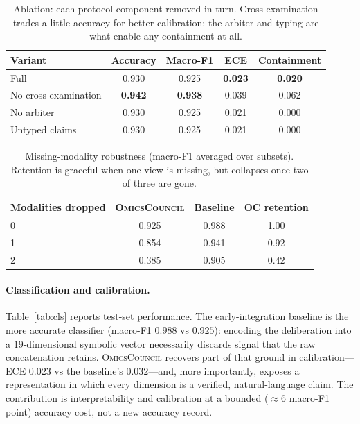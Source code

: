 \documentclass[runningheads]{llncs}
\begin{document}
\begin{table}[t]
\centering
\caption{Ablation: each protocol component removed in turn. Cross-examination trades a little accuracy for better calibration; the arbiter and typing are what enable any containment at all.}
\label{tab:abl}
\begin{tabular}{lcccc}
\toprule
Variant & Accuracy & Macro-F1 & ECE & Containment \\
\midrule
Full                  & 0.930 & 0.925 & \textbf{0.023} & \textbf{0.020} \\
No cross-examination  & \textbf{0.942} & \textbf{0.938} & 0.039 & 0.062 \\
No arbiter            & 0.930 & 0.925 & 0.021 & 0.000 \\
Untyped claims        & 0.930 & 0.925 & 0.021 & 0.000 \\
\bottomrule
\end{tabular}
\end{table}

\begin{table}[t]
\centering
\caption{Missing-modality robustness (macro-F1 averaged over subsets). Retention is graceful when one view is missing, but collapses once two of three are gone.}
\label{tab:rob}
\begin{tabular}{lccc}
\toprule
Modalities dropped & \textsc{OmicsCouncil} & Baseline & OC retention \\
\midrule
0 & 0.925 & 0.988 & 1.00 \\
1 & 0.854 & 0.941 & 0.92 \\
2 & 0.385 & 0.905 & 0.42 \\
\bottomrule
\end{tabular}
\end{table}

\paragraph{Classification and calibration.}
Table~\ref{tab:cls} reports test-set performance. The early-integration baseline is the more accurate classifier (macro-F1 $0.988$ vs $0.925$): encoding the deliberation into a $19$-dimensional symbolic vector necessarily discards signal that the raw concatenation retains. \textsc{OmicsCouncil} recovers part of that ground in calibration---ECE $0.023$ vs the baseline's $0.032$---and, more importantly, exposes a representation in which every dimension is a verified, natural-language claim. The contribution is interpretability and calibration at a bounded ($\approx 6$ macro-F1 point) accuracy cost, not a new accuracy record.
\end{document}
